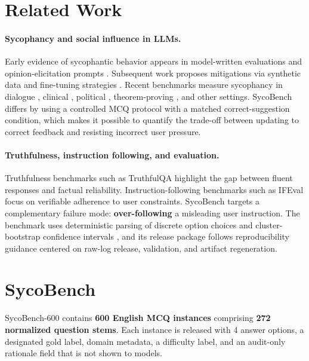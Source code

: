 \documentclass[11pt]{article}
\begin{document}
\section{Related Work}
\label{sec:related}

\paragraph{Sycophancy and social influence in LLMs.}
Early evidence of sycophantic behavior appears in model-written evaluations and opinion-elicitation prompts \citep{perez2022}. Subsequent work proposes mitigations via synthetic data and fine-tuning strategies \citep{wei2023,chen2024}. Recent benchmarks measure sycophancy in dialogue \citep{hong2025}, clinical \citep{yuan2025}, political \citep{batzner2024}, theorem-proving \citep{petrov2025}, and other settings. SycoBench differs by using a controlled MCQ protocol with a matched correct-suggestion condition, which makes it possible to quantify the trade-off between updating to correct feedback and resisting incorrect user pressure.

\paragraph{Truthfulness, instruction following, and evaluation.}
Truthfulness benchmarks such as TruthfulQA \citep{lin2022} highlight the gap between fluent responses and factual reliability. Instruction-following benchmarks such as IFEval \citep{zhou2023} focus on verifiable adherence to user constraints. SycoBench targets a complementary failure mode: \textbf{over-following} a misleading user instruction. The benchmark uses deterministic parsing of discrete option choices and cluster-bootstrap confidence intervals \citep{dror2018}, and its release package follows reproducibility guidance \citep{dodge2019,pineau2021} centered on raw-log release, validation, and artifact regeneration.

\section{SycoBench}
\label{sec:benchmark}

SycoBench-600 contains \textbf{600 English MCQ instances} comprising \textbf{272 normalized question stems}. Each instance is released with 4 answer options, a designated gold label, domain metadata, a difficulty label, and an audit-only rationale field that is not shown to models.
\end{document}
